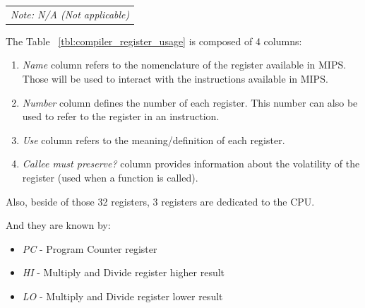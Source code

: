 \documentclass[
  oneside,
  11pt, a4paper,
  footinclude=true,
  headinclude=true,
  cleardoublepage=empty
]{scrbook}
\begin{document}
\begin{table}[h!]
\begin{tabular}{cllc}
\multicolumn{4}{l}{\textit{Note: N/A (Not applicable)}}                                                                                                                                                                                                                                                                  
\end{tabular}
\end{table}

The Table ~\ref{tbl:compiler_register_usage} is composed of 4 columns:

\begin{enumerate}
\item \textit{Name} column refers to the nomenclature of the register available in MIPS. Those will be used to interact with the instructions available in MIPS.
\item \textit{Number} column defines the number of each register. This number can also be used to refer to the register in an instruction.
\item \textit{Use} column refers to the meaning/definition of each register.
\item \textit{Callee must preserve?} column  provides information about the volatility of the register (used when a function is called).

\end{enumerate}

Also, beside of those 32 registers, 3 registers are dedicated to the CPU.

And they are known by:

\begin{itemize}

\item \textit{PC} - Program Counter register
\item \textit{HI} - Multiply and Divide register higher result
\item \textit{LO} - Multiply and Divide register lower result

\end{itemize}
\end{document}
